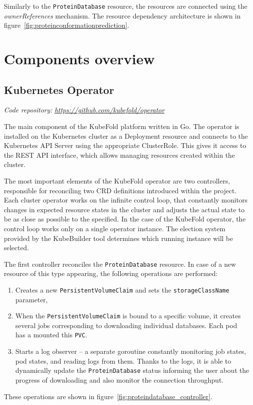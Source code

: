 Similarly to the \texttt{ProteinDatabase} resource, the resources are connected using the \textit{ownerReferences} mechanism.
The resource dependency architecture is shown in figure~\ref{fig:proteinconformationprediction}.


\section{Components overview}

\subsection{Kubernetes Operator}\label{subsec:component-operator}
\textit{Code repository: \url{https://github.com/kubefold/operator}}

The main component of the KubeFold platform written in Go.
The operator is installed on the Kubernetes cluster as a Deployment resource and connects to the Kubernetes API Server using the appropriate ClusterRole.
This gives it access to the REST API interface, which allows managing resources created within the cluster.

The most important elements of the KubeFold operator are two controllers, responsible for reconciling two CRD definitions introduced within the project.
Each cluster operator works on the infinite control loop, that constantly monitors changes in expected resource states in the cluster and adjusts the actual state to be as close as possible to the specified.
In the case of the KubeFold operator, the control loop works only on a single operator instance.
The election system provided by the KubeBuilder tool determines which running instance will be selected.

The first controller reconciles the \texttt{ProteinDatabase} resource.
In case of a new resource of this type appearing, the following operations are performed:
\begin{enumerate}
    \item Creates a new \texttt{PersistentVolumeClaim} and sets the \texttt{storageClassName} parameter,
    \item When the \texttt{PersistentVolumeClaim} is bound to a specific volume, it creates several jobs corresponding to downloading individual databases.
    Each pod has a mounted this \texttt{PVC}.
    \item Starts a log observer -- a separate goroutine constantly monitoring job states, pod states, and reading logs from them.
    Thanks to the logs, it is able to dynamically update the \texttt{ProteinDatabase} status informing the user about the progress of downloading and also monitor the connection throughput.
\end{enumerate}
These operations are shown in figure~\ref{fig:proteindatabase_controller}.

